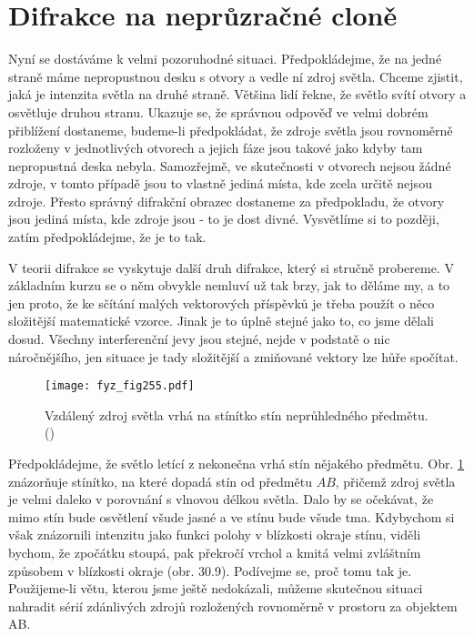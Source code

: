   \section{Difrakce na neprůzračné cloně}\label{fyz:IchapXXXsecVI}
    Nyní se dostáváme k velmi pozoruhodné situaci. Předpokládejme, že na jedné straně máme 
    nepropustnou desku s otvory a vedle ní zdroj světla. Chceme zjistit, jaká je intenzita světla 
    na druhé straně. Většina lidí řekne, že světlo svítí otvory a osvětluje druhou stranu. Ukazuje 
    se, že správnou odpověď ve velmi dobrém přiblížení dostaneme, budeme-li předpokládat, že zdroje 
    světla jsou rovnoměrně rozloženy v jednotlivých otvorech a jejich fáze jsou takové jako kdyby 
    tam nepropustná deska nebyla. Samozřejmě, ve skutečnosti v otvorech nejsou žádné zdroje, v 
    tomto případě jsou to vlastně jediná místa, kde zcela určitě nejsou zdroje. Přesto správný 
    difrakční obrazec dostaneme za předpokladu, že otvory jsou jediná místa, kde zdroje jsou - to 
    je dost divné. Vysvětlíme si to později, zatím předpokládejme, že je to tak.
    
    V teorii difrakce se vyskytuje další druh difrakce, který si stručně probereme. V základním 
    kurzu se o něm obvykle nemluví už tak brzy, jak to děláme my, a to jen proto, že ke sčítání 
    malých vektorových příspěvků je třeba použít o něco složitější matematické vzorce. Jinak je to 
    úplně stejné jako to, co jsme dělali dosud. Všechny interferenční jevy jsou stejné, nejde v 
    podstatě o nic náročnějšího, jen situace je tady složitější a zmiňované vektory lze hůře 
    spočítat.

    \begin{figure}[ht!] %
      \centering
      \texttt{[image: fyz\_fig255.pdf]}
      \caption{Vzdálený zdroj světla vrhá na stínítko stín neprůhledného předmětu.
               (\cite[s.~402]{Feynman01})}
      \label{fyz:fig255}
    \end{figure}
    
    Předpokládejme, že světlo letící z nekonečna vrhá stín nějakého předmětu. Obr. \ref{fyz:fig255} 
    znázorňuje stínítko, na které dopadá stín od předmětu \(AB\), přičemž zdroj světla je velmi 
    daleko v porovnání s vlnovou délkou světla. Dalo by se očekávat, že mimo stín bude osvětlení 
    všude jasné a ve stínu bude všude tma. Kdybychom si však znázornili intenzitu jako funkci 
    polohy v blízkosti okraje stínu, viděli bychom, že zpočátku stoupá, pak překročí vrchol a kmitá 
    velmi zvláštním způsobem v blízkosti okraje (obr. 30.9). Podívejme se, proč tomu tak je. 
    Použijeme-li větu, kterou jsme ještě nedokázali, můžeme skutečnou situaci nahradit sérií 
    zdánlivých zdrojů rozložených rovnoměrně v prostoru za objektem AB.


